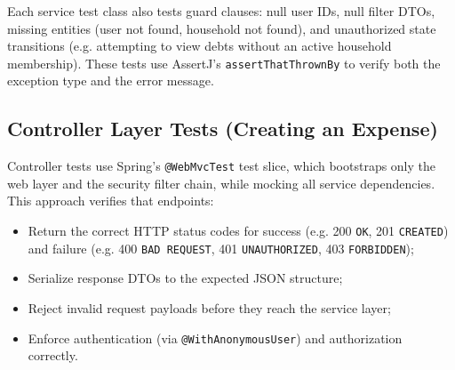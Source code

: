Each service test class also tests guard clauses: null user IDs, null filter DTOs, missing entities (user not found, household not found), and unauthorized state transitions (e.g. attempting to view debts without an active household membership). These tests use AssertJ's \texttt{assertThatThrownBy} to verify both the exception type and the error message.

\subsection{Controller Layer Tests (Creating an Expense)}
Controller tests use Spring's \texttt{@WebMvcTest} test slice, which bootstraps only the web layer and the security filter chain, while mocking all service dependencies. This approach verifies that endpoints:
\begin{itemize}
    \item Return the correct HTTP status codes for success (e.g. 200 \texttt{OK}, 201 \texttt{CREATED}) and failure (e.g. 400 \texttt{BAD REQUEST}, 401 \texttt{UNAUTHORIZED}, 403 \texttt{FORBIDDEN});
    \item Serialize response DTOs to the expected JSON structure;
    \item Reject invalid request payloads before they reach the service layer;
    \item Enforce authentication (via \texttt{@WithAnonymousUser}) and authorization correctly.
\end{itemize}

